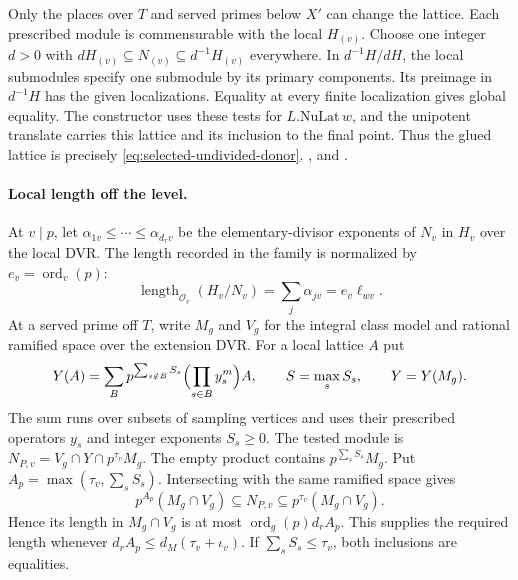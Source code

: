 Only the places over \(T\) and served primes below \(X'\) can
change the lattice. Each prescribed module is commensurable with
the local \(H_{(v)}\). Choose one integer \(d>0\) with
\(dH_{(v)}\subseteq N_{(v)}\subseteq d^{-1}H_{(v)}\) everywhere.
In \(d^{-1}H/dH\), the local submodules specify one submodule
by its primary components. Its preimage in \(d^{-1}H\) has the
given localizations. Equality at every finite localization gives
global equality. The constructor uses these tests for
\(L.\mathrm{NuLat}\,w\), and the unipotent translate carries this
lattice and its inclusion to the final point. Thus the glued
lattice is precisely \eqref{eq:selected-undivided-donor}.
,
 and
.

\paragraph{Local length off the level.}
At \(v\mid p\), let \(\alpha_{1v}\le\cdots\le\alpha_{d_r v}\)
be the elementary-divisor exponents of \(N_v\) in \(H_v\) over
the local DVR. The length recorded in the family is normalized
by \(e_v=\operatorname{ord}_v(p)\):
\begin{equation}
\label{eq:selected-donor-raw-length}
 \operatorname{length}_{\mathcal O_v}(H_v/N_v)
     =\sum_j\alpha_{jv}=e_v\ell_{wv}.
\end{equation}
At a served prime off \(T\), write \(M_g\) and \(V_g\) for the
integral class model and rational ramified space over the
extension DVR. For a local lattice \(A\) put
\[
 Y(A)=\sum_B p^{\sum_{s\notin B} S_s}
                  \Bigl(\prod_{s\in B}y_s^m\Bigr)A,\qquad
 S=\max_s S_s,\qquad Y=Y(M_g).
\]
The sum runs over subsets of sampling vertices and uses their
prescribed operators \(y_s\) and integer exponents \(S_s\ge0\).
The tested module is \(N_{P,v}=V_g\cap Y\cap p^{\tau_v}M_g\).
The empty product contains \(p^{\sum_s S_s}M_g\). Put
\(A_p=\max(\tau_v,\sum_s S_s)\). Intersecting with the same
ramified space gives
\[
 p^{A_p}(M_g\cap V_g)\subseteq N_{P,v}
          \subseteq p^{\tau_v}(M_g\cap V_g).
\]
Hence its length in \(M_g\cap V_g\) is at most
\(\operatorname{ord}_g(p)d_r A_p\). This supplies the required
length whenever \(d_r A_p\le d_M(\tau_v+\iota_v)\). If
\(\sum_s S_s\le\tau_v\), both inclusions are equalities.

